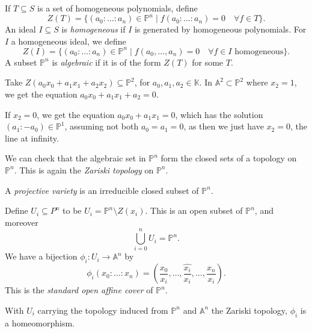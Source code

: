 \documentclass[12pt]{article}
\begin{document}
\begin{definition}
	If $T \subseteq S$ is a set of homogeneous polynomials, define
	\[
		Z(T) = \{(a_0: \ldots: a_n) \in \mathbb{P}^n \mid f(a_0: \ldots: a_n) = 0 \quad \forall f \in T\}.
	\]
	An ideal $I \subseteq S$ is \emph{homogeneous} if $I$ is generated by homogeneous polynomials. For $I$ a homogeneous ideal, we define
	\[
		Z(I) = \{(a_0: \ldots: a_n) \in \mathbb{P}^n \mid f(a_0, \ldots, a_n) = 0 \quad \forall f \in I \text{ homogeneous}\}.
	\]
	A subset $\mathbb{P}^n$ is \emph{algebraic} if it is of the form $Z(T)$ for some $T$.
\end{definition}

\begin{exbox}
	Take $Z(a_0 x_0 + a_1 x_1 + a_2 x_2) \subseteq \mathbb{P}^2$, for $a_0, a_1, a_2 \in \mathbb{K}$. In $\mathbb{A}^2 \subset \mathbb{P}^2$ where $x_2 = 1$, we get the equation $a_0 x_0 + a_1 x_1 + a_2 = 0$.

	If $x_2 = 0$, we get the equation $a_0 x_0 + a_1 x_1 = 0$, which has the solution $(a_1:-a_0) \in \mathbb{P}^1$, assuming not both $a_0 = a_1 = 0$, as then we just have $x_2 = 0$, the line at infinity.
\end{exbox}

We can check that the algebraic set in $\mathbb{P}^n$ form the closed sets of a topology on $\mathbb{P}^n$. This is again the \emph{Zariski topology} on $\mathbb{P}^n$.

\begin{definition}
	A \emph{projective variety} is an irreducible closed subset of $\mathbb{P}^n$.

	Define $U_i \subseteq P^n$ to be $U_i = \mathbb{P}^n \setminus Z(x_i)$. This is an open subset of $\mathbb{P}^n$, and moreover
	\[
	\bigcup_{i = 0}^n U_i = \mathbb{P}^n.
	\]
	We have a bijection $\phi_i : U_i \to \mathbb{A}^n$ by
	\[
		\phi_i(x_0 : \ldots : x_n) = \left( \frac{x_0}{x_i}, \ldots, \widehat{\frac{x_i}{x_i}}, \ldots, \frac{x_n}{x_i} \right).
	\]
	This is the \emph{standard open affine cover} of $\mathbb{P}^n$.
\end{definition}

\begin{proposition}
	With $U_i$ carrying the topology induced from $\mathbb{P}^n$ and $\mathbb{A}^n$ the Zariski topology, $\phi_i$ is a homeomorphism.
\end{proposition}
\end{document}
